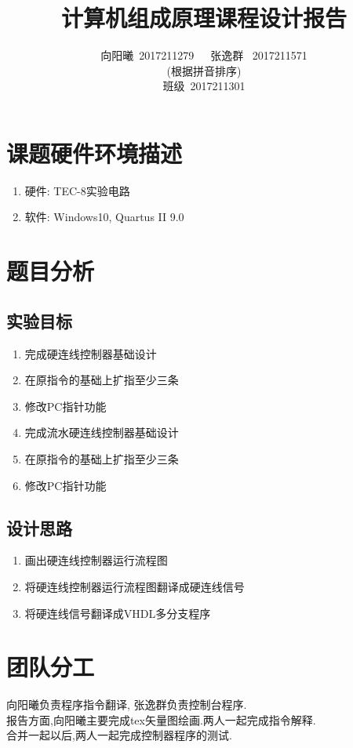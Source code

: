 \documentclass[UTF8]{ctexart}
\title{计算机组成原理课程设计报告}
\author{向阳曦\ 2017211279\ \ \ 张逸群 \ 2017211571\\ (根据拼音排序)\\班级\ 2017211301}
\date{}
\begin{document}
\setlength{\parindent}{2em}
\setlength{\baselineskip}{2.5em}
\maketitle
\tableofcontents
\newpage
\section{课题硬件环境描述}
\begin{enumerate}[1]
	\item 硬件: TEC-8实验电路
	\item 软件: Windows10, Quartus II 9.0
\end{enumerate}
\section{题目分析}
\subsection{实验目标}

\begin{enumerate}[1]
	\item 完成硬连线控制器基础设计
	\item 在原指令的基础上扩指至少三条
	\item 修改PC指针功能
	\item 完成流水硬连线控制器基础设计
	\item 在原指令的基础上扩指至少三条
	\item 修改PC指针功能
\end{enumerate}

\subsection{设计思路}

\begin{enumerate}[1]
	\item 画出硬连线控制器运行流程图
	\item 将硬连线控制器运行流程图翻译成硬连线信号
	\item 将硬连线信号翻译成VHDL多分支程序
\end{enumerate}

\section{团队分工}
向阳曦负责程序指令翻译, 张逸群负责控制台程序.\\
报告方面,向阳曦主要完成tex矢量图绘画.两人一起完成指令解释.\\
\indent 合并一起以后,两人一起完成控制器程序的测试.
\newpage
\end{document}
